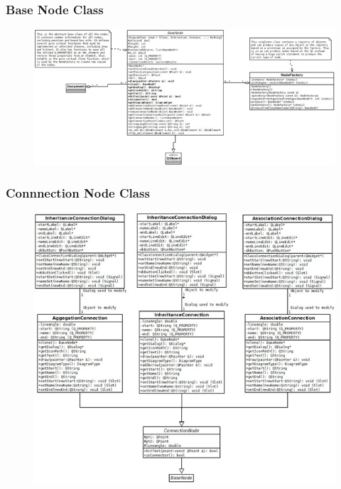 \documentclass[twoside,letterpaper]{article}
\begin{document}
{\subsubsection[\ Base Node Class ]
{\bfseries Base Node Class }

  \begin{figure}[h]
  \centering
  \includegraphics[width=6.5in]{class_basenode.jpeg}
  \end{figure}

\clearpage
\subsubsection[\ Connection Node Class ]
{\bfseries Connnection Node Class }

  \begin{figure}[h]
  \centering
  \includegraphics[width=6.5in]{class_connectionnode.jpeg}
  \end{figure}

}
\end{document}
